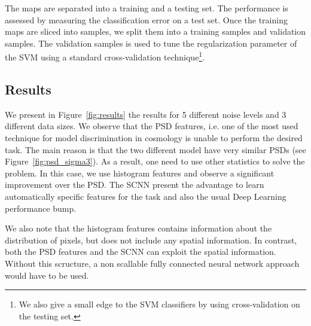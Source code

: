 \documentclass[final,twocolumn,3p,times,authoryear]{elsarticle}
\newcommand{\assign}[1]{{\color[rgb]{.8,.5,.8}{Assigned: #1 }}}
\newcommand{\figref}[1]{Figure~\ref{fig:#1}}
\newcommand{\1}{\b{1}}              %
\newcommand{\0}{\b{0}}              %
\begin{document}
The maps are separated into a training and a testing set. The performance is
assessed by measuring the classification error on a test set. Once the
training maps are sliced into samples, we split them into a training samples
and validation samples. The validation samples is used to tune the
regularization parameter of the SVM using a standard cross-validation
technique\footnote{We also give a small edge to the SVM classifiers by
using cross-validation on the testing set.}.

\subsection{Results}
\assign{Nathanaël, Tomek}

We present in \figref{results} the results for 5 different noise
levels and $3$ different data sizes.  We observe that the PSD features, i.e.
one of the most used technique for model discrimination in cosmology is unable
to perform the desired task. The main reason is that the two different model
have very similar PSDs (see \figref{psd_sigma3}).   As a result, one
need to use other statistics to solve the problem. In this case, we use
histogram features and observe a significant improvement over the PSD.  The
SCNN present the advantage to learn automatically specific features for the
task and also the usual Deep Learning performance bump.

We also note that the histogram features contains information about the
distribution of pixels, but does not include any spatial information. In
contrast, both the PSD features and the SCNN can exploit the spatial
information. Without this scructure, a non scallable fully connected neural network approach would have to be used.
\end{document}
